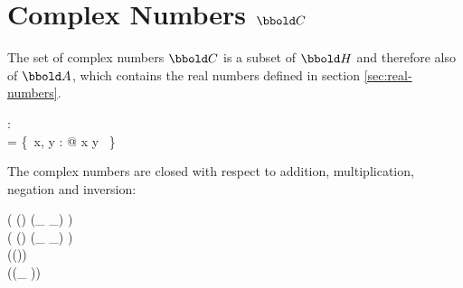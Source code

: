 \documentclass[12pt]{article}
\begin{document}
\section{Complex Numbers $\complex$}
\label{sec:complex-numbers}
The set of complex numbers $\complex$ is a subset of $\quaternions$
and therefore also of $\arithmos$, which contains the real numbers
defined in section \ref{sec:real-numbers}.
%
\begin{axdef}
  \complex : \power \quaternions\\
  \where
  \complex =  \{~x, y  : \real @ x \amult \aone \aplus y \amult \iu~\}
\end{axdef}

The complex numbers are closed with respect to addition,
multiplication, negation and inversion:

\begin{zed}
  \ran ( (\complex \cross \complex) \dres (\_ \aplus \_) ) \subset \complex\\
  \ran ( (\complex \cross \complex) \dres (\_ \amult \_) ) \subset \complex\\
  \ran (\complex \dres (\aneg ))  \subset \complex\\
  \ran (\complex \dres (\_ \ainv ))  \subset \complex\\
\end{zed}
\end{document}
